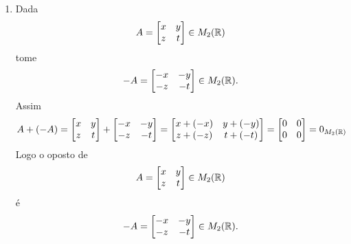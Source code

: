 \documentclass[12pt]{exam}
\begin{document}
\begin{enumerate}
    \item Dada
    \[
        A = \begin{bmatrix}
        x & y\\
        z & t
    \end{bmatrix} \in M_2(\mathbb{R})
    \]
    tome
    \[
        -A = \begin{bmatrix}
        -x & -y\\
        -z & -t
    \end{bmatrix} \in M_2(\mathbb{R}).
    \]
    Assim
    \begin{align*}
      A + (-A) = \begin{bmatrix}
        x & y\\
        z & t
    \end{bmatrix} + \begin{bmatrix}
        -x & -y\\
        -z & -t
    \end{bmatrix} = \begin{bmatrix}
        x + (-x) & y + (-y)\\
        z + (-z)& t + (-t)
    \end{bmatrix} = \begin{bmatrix}
        0 & 0\\
        0 & 0
    \end{bmatrix} = 0_{M_2(\mathbb{R})}
    \end{align*}
    Logo o oposto de
    \[
        A = \begin{bmatrix}
        x & y\\
        z & t
    \end{bmatrix} \in M_2(\mathbb{R})
    \] \'e
    \[
        -A = \begin{bmatrix}
        -x & -y\\
        -z & -t
    \end{bmatrix} \in M_2(\mathbb{R}).
    \]


\end{enumerate}
\end{document}
